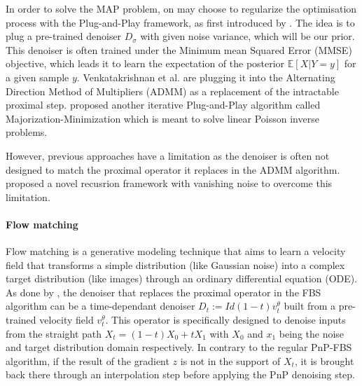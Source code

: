 In order to solve the MAP problem, on may choose to regularize the optimisation process with the Plug-and-Play framework, as first introduced by . The idea is to plug a pre-trained denoiser $D_{\sigma}$ with given noise variance, which will be our prior.
This denoiser is often trained under the Minimum mean Squared Error (MMSE) objective, which leads it to learn the expectation of the posterior $\mathbb{E}\left[X | Y = y\right]$ for a given sample $y$.
Venkatakrishnan et al. are plugging it into the Alternating Direction Method of Multipliers (ADMM) \cite{boyd_distributed_2010} as a replacement of the intractable proximal step.
 proposed another iterative Plug-and-Play algorithm called Majorization-Minimization which is meant to solve linear Poisson inverse problems. 

However, previous approaches have a limitation as the denoiser is often not designed to match the proximal operator it replaces in the ADMM algorithm.
 proposed a novel recusrion framework with vanishing noise to overcome this limitation.

\paragraph{Flow matching}

Flow matching is a generative modeling technique that aims to learn a velocity field that transforms a simple distribution (like Gaussian noise) into a complex target distribution (like images) through an ordinary differential equation (ODE).
As done by , the denoiser that replaces the proximal operator in the FBS algorithm can be a time-dependant denoiser $D_t := Id (1-t)v_t^{\theta}$ built from a pre-trained velocity field $v_t^{\theta}$.
This operator is specifically designed to denoise inputs from the straight path $X_t = (1 - t)X_0 + tX_1$ with $X_0$ and $x_1$ being the noise and target distribution domain respectively.
In contrary to the regular PnP-FBS algorithm, if the result of the gradient $z$ is not in the support of $X_t$, it is brought back there through an interpolation step before applying the PnP denoising step.
